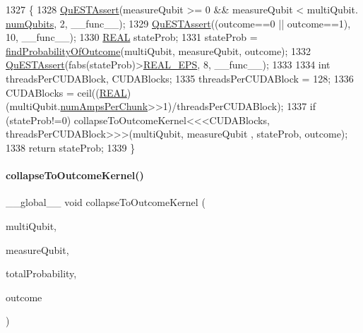 \begin{DoxyCode}
1327 \{        
1328     \mbox{\hyperlink{QuEST__env__localGPU_8cu_a3587b9d533e633ccf1abf9ad2ce45d8d}{QuESTAssert}}(measureQubit >= 0 && measureQubit < multiQubit.
      \mbox{\hyperlink{structMultiQubit_ab5b9795bdc6fb5855e1974dcbbaeb36f}{numQubits}}, 2, \_\_func\_\_);
1329     \mbox{\hyperlink{QuEST__env__localGPU_8cu_a3587b9d533e633ccf1abf9ad2ce45d8d}{QuESTAssert}}((outcome==0 || outcome==1), 10, \_\_func\_\_);
1330     \mbox{\hyperlink{QuEST__precision_8h_a4b654506f18b8bfd61ad2a29a7e38c25}{REAL}} stateProb;
1331     stateProb = \mbox{\hyperlink{QuEST__env__localGPU_8cu_ad315c941a51bc053d39ebfa2040fd32e}{findProbabilityOfOutcome}}(multiQubit, measureQubit, outcome);
1332     \mbox{\hyperlink{QuEST__env__localGPU_8cu_a3587b9d533e633ccf1abf9ad2ce45d8d}{QuESTAssert}}(fabs(stateProb)>\mbox{\hyperlink{QuEST__precision_8h_aebb5e6716e06431296af4d1a71744dec}{REAL\_EPS}}, 8, \_\_func\_\_);
1333 
1334     \textcolor{keywordtype}{int} threadsPerCUDABlock, CUDABlocks;
1335     threadsPerCUDABlock = 128;
1336     CUDABlocks = ceil((\mbox{\hyperlink{QuEST__precision_8h_a4b654506f18b8bfd61ad2a29a7e38c25}{REAL}})(multiQubit.\mbox{\hyperlink{structMultiQubit_a1cad83601a78635dd278259c7ed54f18}{numAmpsPerChunk}}>>1)/threadsPerCUDABlock);
1337     \textcolor{keywordflow}{if} (stateProb!=0) collapseToOutcomeKernel<<<CUDABlocks, threadsPerCUDABlock>>>(multiQubit, measureQubit
      , stateProb, outcome);
1338     \textcolor{keywordflow}{return} stateProb;
1339 \}
\end{DoxyCode}
\mbox{\label{QuEST__env__localGPU_8cu_ab9c5c19b3bd2ac5d1ac4506fa21c1c84}} 
\paragraph{\texorpdfstring{collapse\+To\+Outcome\+Kernel()}{collapseToOutcomeKernel()}}
{\footnotesize\ttfamily \+\_\+\+\_\+global\+\_\+\+\_\+ void collapse\+To\+Outcome\+Kernel (\begin{DoxyParamCaption}\item[{\mbox{\hyperlink{structMultiQubit}{Multi\+Qubit}}}]{multi\+Qubit,  }\item[{int}]{measure\+Qubit,  }\item[{\mbox{\hyperlink{QuEST__precision_8h_a4b654506f18b8bfd61ad2a29a7e38c25}{R\+E\+AL}}}]{total\+Probability,  }\item[{int}]{outcome }\end{DoxyParamCaption})}

